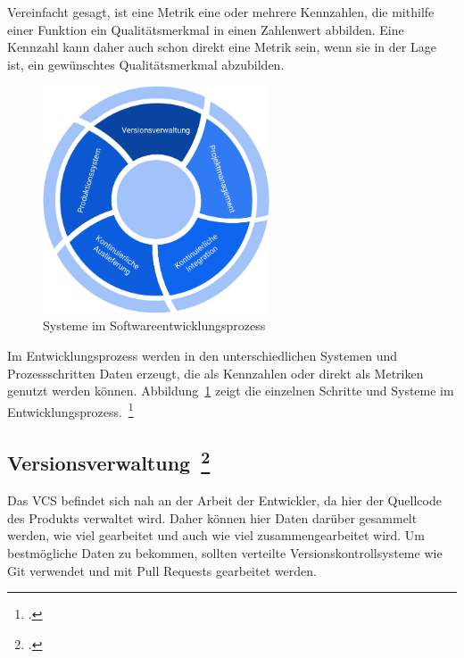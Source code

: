Vereinfacht gesagt, ist eine Metrik eine oder mehrere Kennzahlen, die mithilfe einer Funktion ein Qualitätsmerkmal in einen Zahlenwert abbilden.
Eine Kennzahl kann daher auch schon direkt eine Metrik sein, wenn sie in der Lage ist, ein gewünschtes Qualitätsmerkmal abzubilden.

\begin{savenotes}
  \begin{figure}[H] 
    \centering
       \includegraphics[width=0.6\textwidth]{img/software-development-lifecycle.png}
    \caption[Systeme im Softwareentwicklungsprozess]{Systeme im Softwareentwicklungsprozess~\label{fig:sdlc}}
  \end{figure}
\end{savenotes}

Im Entwicklungsprozess werden in den unterschiedlichen Systemen und Prozessschritten Daten erzeugt, die als Kennzahlen oder direkt als Metriken genutzt werden können.
Abbildung~\ref{fig:sdlc} zeigt die einzelnen Schritte und Systeme im Entwicklungsprozess.~\footcite[vgl.][S.8]{davis_agile_2015}

\clearpage
\subsection[Versionsverwaltung]{Versionsverwaltung~\footcite[vgl.][S.62ff]{davis_agile_2015}}

Das \ac{VCS} befindet sich nah an der Arbeit der Entwickler, da hier der Quellcode des Produkts verwaltet wird.
Daher können hier Daten darüber gesammelt werden, wie viel gearbeitet und auch wie viel zusammengearbeitet wird.
Um bestmögliche Daten zu bekommen, sollten verteilte Versionskontrollsysteme wie Git verwendet und mit Pull Requests gearbeitet werden.

